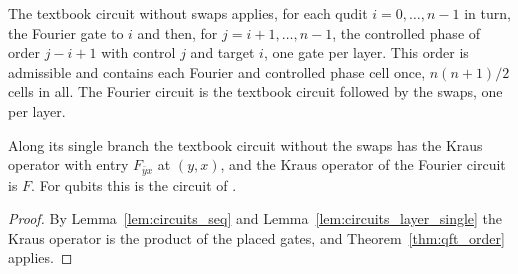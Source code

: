 \begin{definition}
    \label{def:qft_circuit}
    \leanok
    The textbook circuit without swaps applies, for each qudit $i=0,\dots,n-1$ in turn,
    the Fourier gate to $i$ and then, for $j=i+1,\dots,n-1$, the controlled phase of
    order $j-i+1$ with control $j$ and target $i$, one gate per layer. This order is
    admissible and contains each Fourier and controlled phase cell once, $n(n+1)/2$
    cells in all. The Fourier circuit is the textbook circuit followed by the swaps,
    one per layer.
\end{definition}

\begin{theorem}
    \label{thm:qft_kraus}
    \leanok
    Along its single branch the textbook circuit without the swaps has the Kraus
    operator with entry $F_{\bar yx}$ at $(y,x)$, and the Kraus operator of the Fourier
    circuit is $F$. For qubits this is the circuit of
    \cite[Fig.~5.1]{NielsenChuang2010}.
\end{theorem}
\begin{proof}\leanok
    By Lemma~\ref{lem:circuits_seq} and Lemma~\ref{lem:circuits_layer_single} the
    Kraus operator is the product of the placed gates, and
    Theorem~\ref{thm:qft_order} applies.
\end{proof}

